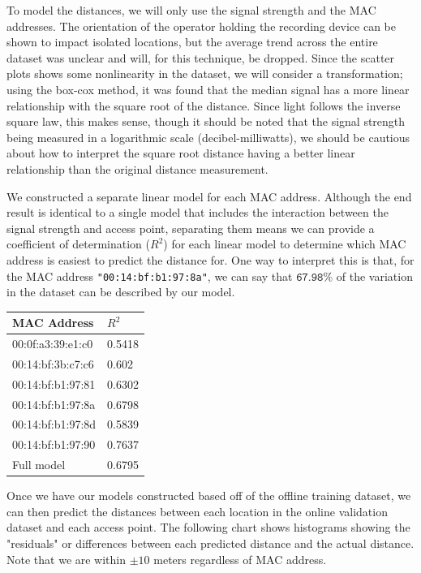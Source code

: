 \documentclass[12pt, conference]{IEEEtran}
\begin{document}
To model the distances, we will only use the signal strength and the MAC addresses. The orientation of the operator holding the recording device can be shown to impact isolated locations, but the average trend across the entire dataset was unclear and will, for this technique, be dropped. Since the scatter plots shows some nonlinearity in the dataset, we will consider a transformation; using the box-cox method, it was found that the median signal has a more linear relationship with the square root of the distance. Since light follows the inverse square law, this makes sense, though it should be noted that the signal strength being measured in a logarithmic scale (decibel-milliwatts), we should be cautious about how to interpret the square root distance having a better linear relationship than the original distance measurement.

We constructed a separate linear model for each MAC address. Although the end result is identical to a single model that includes the interaction between the signal strength and access point, separating them means we can provide a coefficient of determination ($R^2$) for each linear model to determine which MAC address is easiest to predict the distance for. One way to interpret this is that, for the MAC address \texttt{"00:14:bf:b1:97:8a"}, we can say that $\texttt{67.98\%}$ of the variation in the dataset can be described by our model.

\begin{table}[]
  \centering
  \begin{tabular}{|l|l|}
  \hline
  MAC Address       & $R^2$                \\ \hline
  00:0f:a3:39:e1:c0 & 0.5418               \\ \hline
  00:14:bf:3b:c7:c6 & 0.602                \\ \hline
  00:14:bf:b1:97:81 & 0.6302               \\ \hline
  00:14:bf:b1:97:8a & 0.6798               \\ \hline
  00:14:bf:b1:97:8d & 0.5839               \\ \hline
  00:14:bf:b1:97:90 & 0.7637               \\ \hline
  Full model        & 0.6795               \\ \hline
  \end{tabular} \label{fig: lm_r2}
\end{table}

Once we have our models constructed based off of the offline training dataset, we can then predict the distances between each location in the online validation dataset and each access point. The following chart shows histograms showing the "residuals" or differences between each predicted distance and the actual distance. Note that we are within $\pm 10$ meters regardless of MAC address.
\end{document}
